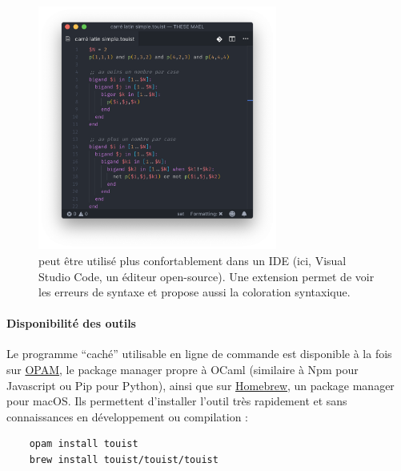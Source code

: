 \begin{figure}[!ht] \centering
  \includegraphics[width=0.7\textwidth]{figures/vscode-touist}
  \caption{\touist peut être utilisé plus confortablement dans un IDE (ici, Visual Studio Code, un éditeur open-source). Une extension permet de voir les erreurs de syntaxe et propose aussi la coloration syntaxique.} \label{fig:touist-vscode}
\end{figure}

\paragraph{Disponibilité des outils}

Le programme \enquote{caché} utilisable en ligne de commande est disponible à la fois sur \href{https://opam.ocaml.org/packages/touist}{OPAM}, le package manager propre à OCaml (similaire à Npm pour Javascript ou Pip pour Python), ainsi que sur \href{https://github.com/touist/homebrew-touist}{Homebrew}, un package manager pour macOS. Ils permettent d'installer l'outil très rapidement et sans connaissances en développement ou compilation :

\begin{verbatim}
    opam install touist
    brew install touist/touist/touist
\end{verbatim}